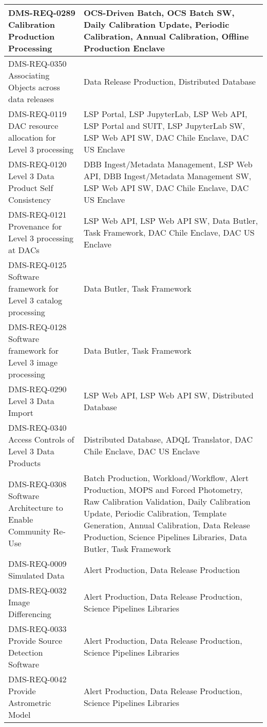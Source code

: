 \begin{longtable}{p{}p{}}
DMS-REQ-0289 Calibration Production Processing & OCS-Driven Batch, OCS Batch SW, Daily Calibration Update, Periodic Calibration, Annual Calibration, Offline Production Enclave \\ \hline
DMS-REQ-0350 Associating Objects across data releases & Data Release Production, Distributed Database \\ \hline
DMS-REQ-0119 DAC resource allocation for Level 3 processing & LSP Portal, LSP JupyterLab, LSP Web API, LSP Portal and SUIT, LSP JupyterLab SW, LSP Web API SW, DAC Chile Enclave, DAC US Enclave \\ \hline
DMS-REQ-0120 Level 3 Data Product Self Consistency & DBB Ingest/Metadata Management, LSP Web API, DBB Ingest/Metadata Management SW, LSP Web API SW, DAC Chile Enclave, DAC US Enclave \\ \hline
DMS-REQ-0121 Provenance for Level 3 processing at DACs & LSP Web API, LSP Web API SW, Data Butler, Task Framework, DAC Chile Enclave, DAC US Enclave \\ \hline
DMS-REQ-0125 Software framework for Level 3 catalog processing & Data Butler, Task Framework \\ \hline
DMS-REQ-0128 Software framework for Level 3 image processing & Data Butler, Task Framework \\ \hline
DMS-REQ-0290 Level 3 Data Import & LSP Web API, LSP Web API SW, Distributed Database \\ \hline
DMS-REQ-0340 Access Controls of Level 3 Data Products & Distributed Database, ADQL Translator, DAC Chile Enclave, DAC US Enclave \\ \hline
DMS-REQ-0308 Software Architecture to Enable Community Re-Use & Batch Production, Workload/Workflow, Alert Production, MOPS and Forced Photometry, Raw Calibration Validation, Daily Calibration Update, Periodic Calibration, Template Generation, Annual Calibration, Data Release Production, Science Pipelines Libraries, Data Butler, Task Framework \\ \hline
DMS-REQ-0009 Simulated Data & Alert Production, Data Release Production \\ \hline
DMS-REQ-0032 Image Differencing & Alert Production, Data Release Production, Science Pipelines Libraries \\ \hline
DMS-REQ-0033 Provide Source Detection Software & Alert Production, Data Release Production, Science Pipelines Libraries \\ \hline
DMS-REQ-0042 Provide Astrometric Model & Alert Production, Data Release Production, Science Pipelines Libraries \\ \hline

\end{longtable}
